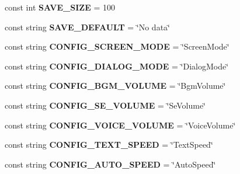 \begin{DoxyCompactItemize}
\item 
const int {\bfseries S\+A\+V\+E\+\_\+\+S\+I\+ZE} = 100\hypertarget{class_game_constants_a69ad3f5e814d338ef2b93df126ef5f81}{}\label{class_game_constants_a69ad3f5e814d338ef2b93df126ef5f81}

\item 
const string {\bfseries S\+A\+V\+E\+\_\+\+D\+E\+F\+A\+U\+LT} = \char`\"{}No data\char`\"{}\hypertarget{class_game_constants_aa3209569787d3b7904305cc9495b4b18}{}\label{class_game_constants_aa3209569787d3b7904305cc9495b4b18}

\item 
const string {\bfseries C\+O\+N\+F\+I\+G\+\_\+\+S\+C\+R\+E\+E\+N\+\_\+\+M\+O\+DE} = \char`\"{}Screen\+Mode\char`\"{}\hypertarget{class_game_constants_a114aaf72c90e80a87d9a6a96ef79faf9}{}\label{class_game_constants_a114aaf72c90e80a87d9a6a96ef79faf9}

\item 
const string {\bfseries C\+O\+N\+F\+I\+G\+\_\+\+D\+I\+A\+L\+O\+G\+\_\+\+M\+O\+DE} = \char`\"{}Dialog\+Mode\char`\"{}\hypertarget{class_game_constants_ab9e2f6a9560202eb7d1bee0f72e4c541}{}\label{class_game_constants_ab9e2f6a9560202eb7d1bee0f72e4c541}

\item 
const string {\bfseries C\+O\+N\+F\+I\+G\+\_\+\+B\+G\+M\+\_\+\+V\+O\+L\+U\+ME} = \char`\"{}Bgm\+Volume\char`\"{}\hypertarget{class_game_constants_a5acdf6ce99446932589ff62ae580ca0e}{}\label{class_game_constants_a5acdf6ce99446932589ff62ae580ca0e}

\item 
const string {\bfseries C\+O\+N\+F\+I\+G\+\_\+\+S\+E\+\_\+\+V\+O\+L\+U\+ME} = \char`\"{}Se\+Volume\char`\"{}\hypertarget{class_game_constants_a381860d26a6c2fb61ed91da1aa271c4c}{}\label{class_game_constants_a381860d26a6c2fb61ed91da1aa271c4c}

\item 
const string {\bfseries C\+O\+N\+F\+I\+G\+\_\+\+V\+O\+I\+C\+E\+\_\+\+V\+O\+L\+U\+ME} = \char`\"{}Voice\+Volume\char`\"{}\hypertarget{class_game_constants_a1459014a48ebad632a38ac0068819792}{}\label{class_game_constants_a1459014a48ebad632a38ac0068819792}

\item 
const string {\bfseries C\+O\+N\+F\+I\+G\+\_\+\+T\+E\+X\+T\+\_\+\+S\+P\+E\+ED} = \char`\"{}Text\+Speed\char`\"{}\hypertarget{class_game_constants_a387d1b143886033e60c28a2198cf1356}{}\label{class_game_constants_a387d1b143886033e60c28a2198cf1356}

\item 
const string {\bfseries C\+O\+N\+F\+I\+G\+\_\+\+A\+U\+T\+O\+\_\+\+S\+P\+E\+ED} = \char`\"{}Auto\+Speed\char`\"{}\hypertarget{class_game_constants_a6dbf22dddb82134d011196c2c6806872}{}\label{class_game_constants_a6dbf22dddb82134d011196c2c6806872}


\end{DoxyCompactItemize}
